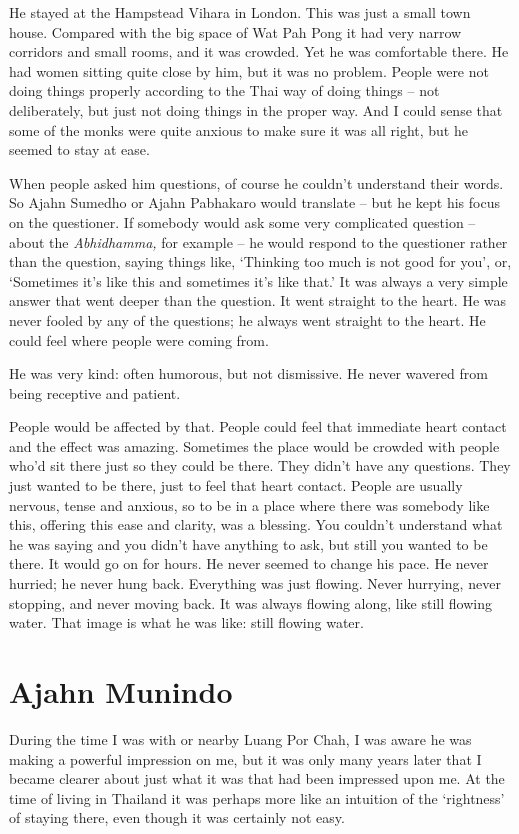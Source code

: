 He stayed at the Hampstead Vihara in London. This was just a small town
house. Compared with the big space of Wat Pah Pong it had very narrow
corridors and small rooms, and it was crowded. Yet he was comfortable
there. He had women sitting quite close by him, but it was no problem. 
People were not doing things properly according to the Thai way of doing
things -- not deliberately, but just not doing things in the proper way. 
And I could sense that some of the monks were quite anxious to make sure
it was all right, but he seemed to stay at ease. 

When people asked him questions, of course he couldn't understand their
words. So Ajahn Sumedho or Ajahn Pabhakaro would translate -- but he
kept his focus on the questioner. If somebody would ask some very
complicated question -- about the \emph{Abhidhamma,} for example -- he
would respond to the questioner rather than the question, saying things
like, `Thinking too much is not good for you', or, `Sometimes it's like
this and sometimes it's like that.' It was always a very simple answer
that went deeper than the question. It went straight to the heart. He
was never fooled by any of the questions; he always went straight to the
heart. He could feel where people were coming from. 

He was very kind: often humorous, but not dismissive. He never wavered
from being receptive and patient. 

People would be affected by that. People could feel that immediate heart
contact and the effect was amazing. Sometimes the place would be crowded
with people who'd sit there just so they could be there. They didn't
have any questions. They just wanted to be there, just to feel that
heart contact. People are usually nervous, tense and anxious, so to be
in a place where there was somebody like this, offering this ease and
clarity, was a blessing. You couldn't understand what he was saying and
you didn't have anything to ask, but still you wanted to be there. It
would go on for hours. He never seemed to change his pace. He never
hurried; he never hung back. Everything was just flowing. Never
hurrying, never stopping, and never moving back. It was always flowing
along, like still flowing water. That image is what he was like: still
flowing water. 

\section{Ajahn Munindo}

During the time I was with or nearby Luang Por Chah, I was aware he was
making a powerful impression on me, but it was only many years later
that I became clearer about just what it was that had been impressed
upon me. At the time of living in Thailand it was perhaps more like an
intuition of the `rightness' of staying there, even though it was
certainly not easy. 

